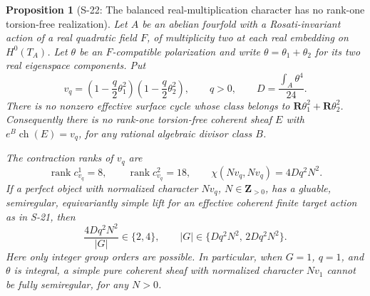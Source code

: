\documentclass[11pt,a4paper]{article}
\newtheorem{proposition}[theorem]{Proposition}
\theoremstyle{definition}
\begin{document}
\begin{proposition}[S-22: The balanced real-multiplication character has no rank-one torsion-free realization]
\label{prop:semireg-rm-balanced-obstruction}
Let $A$ be an abelian fourfold with a Rosati-invariant action
of a real quadratic field $F$, of multiplicity two at each
real embedding on $H^0(T_A)$. Let $\theta$ be an $F$-compatible
polarization and write $\theta=\theta_1+\theta_2$ for its two
real eigenspace components. Put
\[
 v_q=\left(1-\frac q2\theta_1^2\right)
       \left(1-\frac q2\theta_2^2\right),
 \qquad q>0,
 \qquad D=\frac{\int_A\theta^4}{24}.
 \tag{S22.1}
\]
There is no nonzero effective surface cycle whose class
belongs to $\mathbf R\theta_1^2+\mathbf R\theta_2^2$.
Consequently there is no rank-one torsion-free coherent
sheaf $E$ with $e^B\operatorname{ch}(E)=v_q$, for any
rational algebraic divisor class $B$.

The contraction ranks of $v_q$ are
\[
 \operatorname{rank}c_{v_q}^1=8,
 \qquad \operatorname{rank}c_{v_q}^2=18,
 \qquad \chi(Nv_q,Nv_q)=4Dq^2N^2.
 \tag{S22.2}
\]
If a perfect object with normalized character $Nv_q$,
$N\in\mathbf Z_{>0}$, has a gluable, semiregular, equivariantly simple
lift for an effective coherent finite target action as in
S-21, then
\[
 \frac{4Dq^2N^2}{|G|}\in\{2,4\},
 \qquad |G|\in\{Dq^2N^2,\,2Dq^2N^2\}.
 \tag{S22.3}
\]
Here only integer group orders are possible. In particular,
when $G=1$, $q=1$, and $\theta$ is integral, a simple pure
coherent sheaf with normalized character $Nv_1$ cannot be
fully semiregular, for any $N>0$.
\end{proposition}
\end{document}
